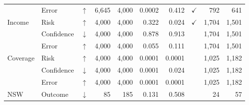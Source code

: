 \begin{table}[!ht]
\begin{tabular}{l l c r r r r c r r}
                 & Error      & $\uparrow$   & 6{,}645 & 4{,}000 & 0.0002 & 0.412 & $\checkmark$ & 792   & 641   \\
    \cmidrule(lr){1-10}
    Income       & Risk       & $\uparrow$   & 4{,}000 & 4{,}000 & 0.322 & 0.024 & $\checkmark$ & 1{,}704 & 1{,}501 \\
                 & Confidence & $\downarrow$ & 4{,}000 & 4{,}000 & 0.878 & 0.913 &              & 1{,}704 & 1{,}501 \\
                 & Error      & $\uparrow$   & 4{,}000 & 4{,}000 & 0.055 & 0.111 &              & 1{,}704 & 1{,}501 \\
    \cmidrule(lr){1-10}
    Coverage     & Risk       & $\uparrow$   & 4{,}000 & 4{,}000 & 0.0001 & 0.0001 &              & 1{,}025 & 1{,}182 \\
                  & Confidence & $\downarrow$ & 4{,}000 & 4{,}000 & 0.0001 & 0.024 &              & 1{,}025 & 1{,}182 \\
                  & Error      & $\uparrow$   & 4{,}000 & 4{,}000 & 0.0001 & 0.0001 &              & 1{,}025 & 1{,}182 \\
    \cmidrule(lr){1-10}
    NSW          & Outcome    & $\downarrow$ & 85     & 185    & 0.131 & 0.508 &              & 24     & 57    \\
    \bottomrule
  \end{tabular}
\end{table}
